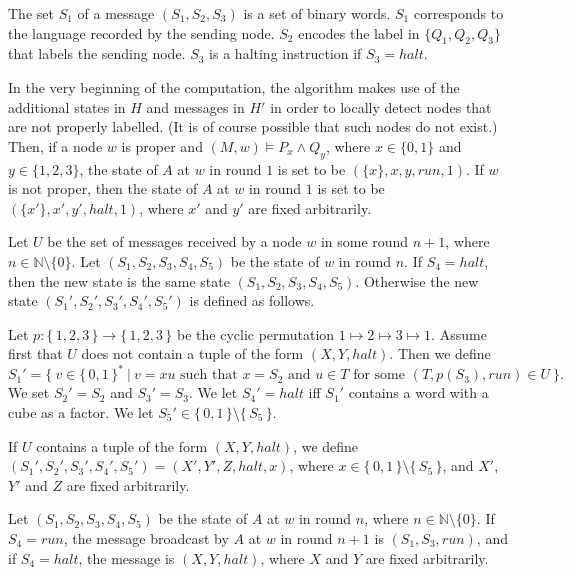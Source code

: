 \documentclass[copyright,creativecommons]{eptcs}
\begin{document}
The set $S_1$ of a message $(S_1,S_2,S_3)$ is a
set of binary words. $S_1$ corresponds to the language recorded by the sending node.
$S_2$ encodes the label in $\{ Q_1,Q_2,Q_3 \}$ that labels the sending node.
$S_3$ is a halting instruction if $S_3 = \mathit{halt}$.




In the very beginning of the computation,
the algorithm makes use of the additional states in $H$ 
and messages in $H'$ in order to locally detect nodes that
are not properly labelled. (It is of course possible that such
nodes do not exist.)
Then, if a node $w$ is proper and $(M,w)\models P_x \wedge Q_y$, where $x\in\{0,1\}$ and $y\in\{1,2,3\}$,
the state of $A$ at $w$ in round $1$
is set to be $(\{x\},x,y,\mathit{run},1)$.
If $w$ is not proper, then the state of $A$ at $w$ in round $1$ is
set to be $(\{x'\},x',y',\mathit{halt},1)$, where $x'$ and $y'$ are fixed arbitrarily.




Let $U$ be the set of messages received by a node $w$ in some round $n+1$,
where $n\in\mathbb{N}\setminus\{0\}$.
Let $(S_1,S_2,S_3,S_4,S_5)$ be the state of $w$ in round $n$.
If $S_4 = \mathit{halt}$, then the new state is the same 
state $(S_1,S_2,S_3,S_4,S_5)$.
Otherwise the new state $(S_1',S_2',S_3',S_4',S_5')$ is defined as follows.




Let $p:\{\, 1,2,3\, \}\rightarrow\{\, 1,2,3\, \}$ be the cyclic permutation
$1\mapsto 2 \mapsto 3 \mapsto 1$.
Assume first that $U$ does not contain a tuple of the form $(X,Y,\mathit{halt})$.
Then we define 
$$S_1' = \{\ v\in\{\, 0,1\, \}^*\ |\ v = xu\text{ such that }x = S_2\text{ and }u\in T
\text{ for some }(T,p(S_3),\mathit{run})\in U\ \}.$$
We set $S_2' = S_2$ and $S_3' = S_3$. We let $S_4' = \mathit{halt}$ iff $S_1'$ contains a word with a cube as a factor.
We let $S_5' \in \{\, 0,1\, \}\setminus\{\, S_5\, \}$.




If $U$ contains a tuple of the form $(X,Y,\mathit{halt})$,
we define $(S_1',S_2',S_3',S_4',S_5') = (X',Y',Z,\mathit{halt},x)$,
where $x \in \{\, 0,1\, \}\setminus\{\, S_5\, \}$, and $X'$, $Y'$ and $Z$ are fixed arbitrarily.




Let $(S_1,S_2,S_3,S_4,S_5)$ be the state of $A$ at $w$ in round $n$, where $n\in\mathbb{N}\setminus\{0\}$.
If $S_4 = \mathit{run}$, the  message
broadcast by $A$ at $w$ in round $n+1$ is $(S_1,S_3,\mathit{run})$, and if $S_4 = \mathit{halt}$, the
message is $(X,Y,\mathit{halt})$, where $X$ and $Y$  are fixed arbitrarily.
\end{document}
